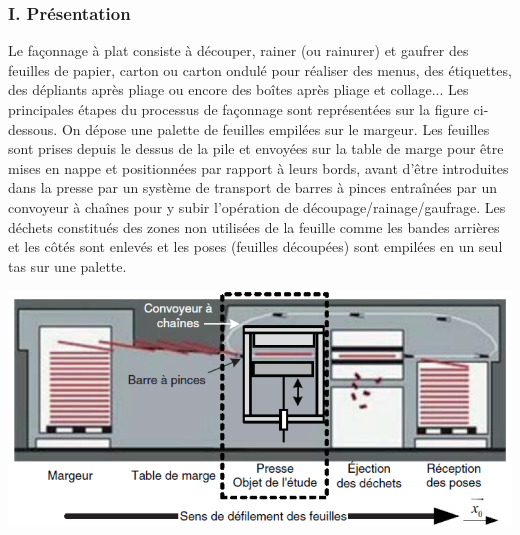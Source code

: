 \subsubsection{I. Pr\'esentation}
Le fa\c{c}onnage \`a plat consiste \`a d\'ecouper, rainer (ou rainurer) et gaufrer des feuilles de papier, carton
ou carton ondul\'e pour r\'ealiser des menus, des \'etiquettes, des d\'epliants apr\`es pliage ou encore des bo\^ites
apr\`es pliage et collage... Les principales \'etapes du processus de fa\c{c}onnage sont repr\'esent\'ees sur la figure ci-dessous.
On d\'epose une palette de feuilles empil\'ees sur le margeur. Les feuilles sont prises depuis le dessus
de la pile et envoy\'ees sur la table de marge pour \^etre mises en nappe et positionn\'ees par rapport \`a leurs
bords, avant d'\^etre introduites dans la presse par un syst\`eme de transport de barres \`a pinces entra\^in\'ees par
un convoyeur \`a cha\^ines pour y subir l'op\'eration de d\'ecoupage/rainage/gaufrage. Les d\'echets constitu\'es des
zones non utilis\'ees de la feuille comme les bandes arri\`eres et les c\^ot\'es sont enlev\'es et les poses (feuilles
d\'ecoup\'ees) sont empil\'ees en un seul tas sur une palette.

\begin{center}
\includegraphics[scale=0.35]{png/image1_prob3.png}
\end{center}

